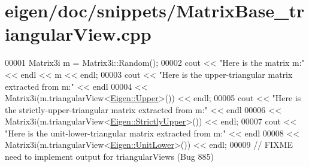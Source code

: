 \hypertarget{eigen_2doc_2snippets_2_matrix_base__triangular_view_8cpp_source}{}\section{eigen/doc/snippets/\+Matrix\+Base\+\_\+triangular\+View.cpp}
\label{eigen_2doc_2snippets_2_matrix_base__triangular_view_8cpp_source}

\begin{DoxyCode}
00001 Matrix3i m = Matrix3i::Random();
00002 cout << \textcolor{stringliteral}{"Here is the matrix m:"} << endl << m << endl;
00003 cout << \textcolor{stringliteral}{"Here is the upper-triangular matrix extracted from m:"} << endl
00004      << Matrix3i(m.triangularView<\hyperlink{group__enums_gga39e3366ff5554d731e7dc8bb642f83cda6bcb58be3b8b8ec84859ce0c5ac0aaec}{Eigen::Upper}>()) << endl;
00005 cout << \textcolor{stringliteral}{"Here is the strictly-upper-triangular matrix extracted from m:"} << endl
00006      << Matrix3i(m.triangularView<\hyperlink{group__enums_gga39e3366ff5554d731e7dc8bb642f83cdae38aad7d66fecfb213fce453edff4c7a}{Eigen::StrictlyUpper}>()) << endl;
00007 cout << \textcolor{stringliteral}{"Here is the unit-lower-triangular matrix extracted from m:"} << endl
00008      << Matrix3i(m.triangularView<\hyperlink{group__enums_gga39e3366ff5554d731e7dc8bb642f83cda8155cfdfde9e75e7144dff0393d17181}{Eigen::UnitLower}>()) << endl;
00009 \textcolor{comment}{// FIXME need to implement output for triangularViews (Bug 885)}
\end{DoxyCode}
